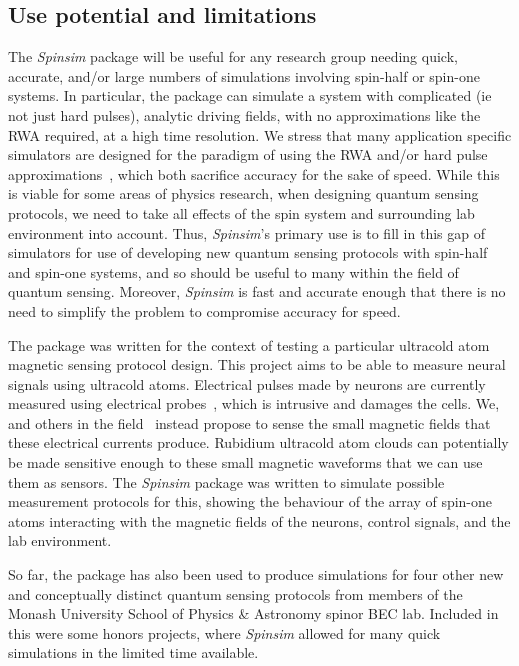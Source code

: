 \documentclass{jors}
\begin{document}
	\subsection{Use potential and limitations}
		The \emph{Spinsim} package will be useful for any research group needing quick, accurate, and/or large numbers of simulations involving spin-half or spin-one systems.
		In particular, the package can simulate a system with complicated (ie not just hard pulses), analytic driving fields, with no approximations like the RWA required, at a high time resolution.
		We stress that many application specific simulators are designed for the paradigm of using the RWA and/or hard pulse approximations~\cite{suzuki_qulacs_2021, teske_qopt_2021, isakov_simulations_2021}, which both sacrifice accuracy for the sake of speed.
		While this is viable for some areas of physics research, when designing quantum sensing protocols, we need to take all effects of the spin system and surrounding lab environment into account.
		Thus, \emph{Spinsim}'s primary use is to fill in this gap of simulators for use of developing new quantum sensing protocols with spin-half and spin-one systems, and so should be useful to many within the field of quantum sensing.
		Moreover, \emph{Spinsim} is fast and accurate enough that there is no need to simplify the problem to compromise accuracy for speed.
		
		The package was written for the context of testing a particular ultracold atom magnetic sensing protocol design.
		This project aims to be able to measure neural signals using ultracold atoms.
		Electrical pulses made by neurons are currently measured using electrical probes~\cite{mitterdorfer_potassium_2002}, which is intrusive and damages the cells.
		We, and others in the field~\cite{barry_optical_2016, xu_wavelet-based_2016, parashar_axon_2020, webb_high_2021} instead propose to sense the small magnetic fields that these electrical currents produce.
		Rubidium ultracold atom clouds can potentially be made sensitive enough to these small magnetic waveforms that we can use them as sensors.
		The \emph{Spinsim} package was written to simulate possible measurement protocols for this, showing the behaviour of the array of spin-one atoms interacting with the magnetic fields of the neurons, control signals, and the lab environment.

		So far, the package has also been used to produce simulations for four other new and conceptually distinct quantum sensing protocols from members of the Monash University School of Physics \& Astronomy spinor BEC lab.
		Included in this were some honors projects, where \emph{Spinsim} allowed for many quick simulations in the limited time available.
\end{document}
